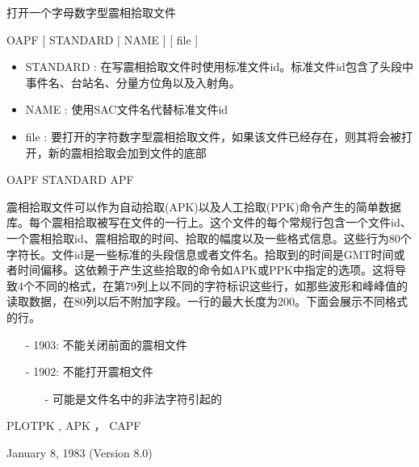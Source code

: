 \label{cmd:oapf}

打开一个字母数字型震相拾取文件

OAPF [ STANDARD | NAME ] [ file ]

\begin{itemize}
\item STANDARD : 在写震相拾取文件时使用标准文件id。标准文件id包含了头段中事件名、台站名、分量方位角以及入射角。 
\item NAME : 使用SAC文件名代替标准文件id 
\item file : 要打开的字符数字型震相拾取文件，如果该文件已经存在，则其将会被打开，新的震相拾取会加到文件的底部 
\end{itemize}

OAPF STANDARD APF

震相拾取文件可以作为自动拾取(APK)以及人工拾取(PPK)命令产生的简单数据库。每个震相拾取被写在文件的一行上。这个文件的每个常规行包含一个文件id、一个震相拾取id、震相拾取的时间、拾取的幅度以及一些格式信息。这些行为80个字符长。文件id是一些标准的头段信息或者文件名。拾取到的时间是GMT时间或者时间偏移。这依赖于产生这些拾取的命令如APK或PPK中指定的选项。这将导致4个不同的格式，在第79列上以不同的字符标识这些行，如那些波形和峰峰值的读取数据，在80列以后不附加字段。一行的最大长度为200。下面会展示不同格式的行。

\begin{itemize}
\item[-]1903: 不能关闭前面的震相文件
\item[-]1902: 不能打开震相文件
	\begin{itemize}
	\item[-]可能是文件名中的非法字符引起的
	\end{itemize}
\end{itemize}

PLOTPK , APK ， CAPF

January 8, 1983 (Version 8.0)
